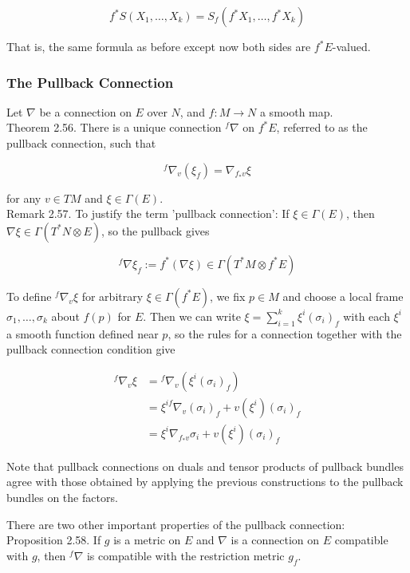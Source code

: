 \documentclass[10pt, letterpaper]{article}
\begin{document}
$$
f^{*} S\left(X_{1}, \ldots, X_{k}\right)=S_{f}\left(f^{*} X_{1}, \ldots, f^{*} X_{k}\right)
$$

That is, the same formula as before except now both sides are $f^{*} E$-valued.

\subsubsection*{The Pullback Connection}
Let $\nabla$ be a connection on $E$ over $N$, and $f: M \rightarrow N$ a smooth map.\\
Theorem 2.56. There is a unique connection ${ }^{f} \nabla$ on $f^{*} E$, referred to as the pullback connection, such that

$$
{ }^{f} \nabla_{v}\left(\xi_{f}\right)=\nabla_{f_{*} v} \xi
$$

for any $v \in T M$ and $\xi \in \Gamma(E)$.\\
Remark 2.57. To justify the term 'pullback connection': If $\xi \in \Gamma(E)$, then $\nabla \xi \in \Gamma\left(T^{*} N \otimes E\right)$, so the pullback gives

$$
{ }^{f} \nabla \xi_{f}:=f^{*}(\nabla \xi) \in \Gamma\left(T^{*} M \otimes f^{*} E\right)
$$

To define ${ }^{f} \nabla_{v} \xi$ for arbitrary $\xi \in \Gamma\left(f^{*} E\right)$, we fix $p \in M$ and choose a local frame $\sigma_{1}, \ldots, \sigma_{k}$ about $f(p)$ for $E$. Then we can write $\xi=\sum_{i=1}^{k} \xi^{i}\left(\sigma_{i}\right)_{f}$ with each $\xi^{i}$ a smooth function defined near $p$, so the rules for a connection together with the pullback connection condition give

$$
\begin{aligned}
{ }^{f} \nabla_{v} \xi & ={ }^{f} \nabla_{v}\left(\xi^{i}\left(\sigma_{i}\right)_{f}\right) \\
& =\xi^{i f} \nabla_{v}\left(\sigma_{i}\right)_{f}+v\left(\xi^{i}\right)\left(\sigma_{i}\right)_{f} \\
& =\xi^{i} \nabla_{f_{*} v} \sigma_{i}+v\left(\xi^{i}\right)\left(\sigma_{i}\right)_{f}
\end{aligned}
$$

Note that pullback connections on duals and tensor products of pullback bundles agree with those obtained by applying the previous constructions to the pullback bundles on the factors.

There are two other important properties of the pullback connection:\\
Proposition 2.58. If $g$ is a metric on $E$ and $\nabla$ is a connection on $E$ compatible with $g$, then ${ }^{f} \nabla$ is compatible with the restriction metric $g_{f}$.
\end{document}
